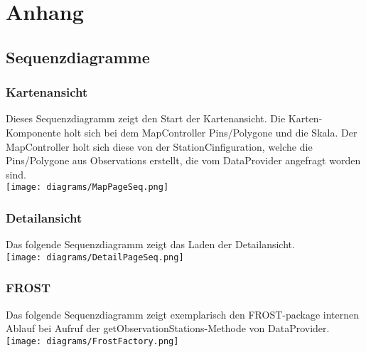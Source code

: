 \section{Anhang}
\subsection{Sequenzdiagramme}
\subsubsection*{Kartenansicht}
Dieses Sequenzdiagramm zeigt den Start der \gls{Kartenansicht}. Die Karten-Komponente holt sich bei dem MapController Pins/Polygone und die Skala. 
Der MapController holt sich diese von der StationCinfiguration, welche die Pins/Polygone aus Observations erstellt, die vom DataProvider angefragt worden sind.
\\
\texttt{[image: diagrams/MapPageSeq.png]}

\newpage
\subsubsection*{Detailansicht}
Das folgende Sequenzdiagramm zeigt das Laden der \gls{Detailansicht}.\\


\texttt{[image: diagrams/DetailPageSeq.png]}

\newpage
\subsubsection*{FROST}
Das folgende Sequenzdiagramm zeigt exemplarisch den FROST-package internen Ablauf bei Aufruf der getObservationStations-Methode von DataProvider.\\


\texttt{[image: diagrams/FrostFactory.png]}